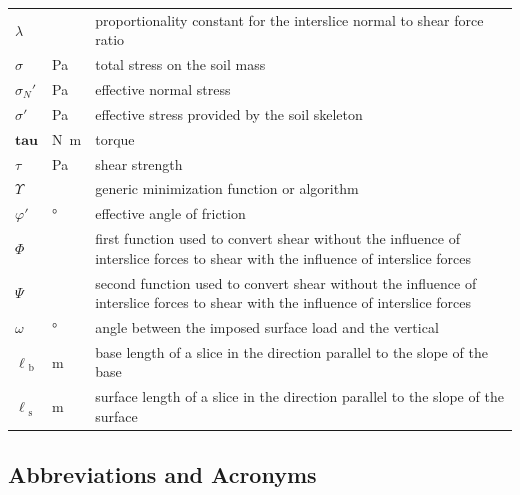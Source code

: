 \documentclass[12pt]{article}
\renewcommand{\arraystretch}{1}
\begin{document}
\begin{longtable*}{  l  l  p{8.5cm}  }
$\lambda{}$ & & proportionality constant for the interslice normal to shear 
force ratio
\\
$\sigma{}$ & \si{\pascal} & total stress on the soil mass
\\
$\sigma{}_N'$ & \si{\pascal} & effective normal stress
\\
$\sigma{}'$ & \si{\pascal} & effective stress provided by the soil skeleton
\\
$\textbf{tau{}}$ & \si{\newton\meter} & torque
\\
$\tau{}$ & \si{\pascal} & shear strength
\\
$\Upsilon{}$ & & generic minimization function or algorithm 
\\
$\varphi{}'$ & \si{\degree} & effective angle of friction
\\
$\Phi{}$ & & first function used to convert shear without the 
influence of interslice forces to shear with the influence of 
interslice forces
\\
$\Psi{}$ & & second function used to convert shear without the 
influence of interslice forces to shear with the influence of interslice 
forces
\\
$\omega{}$ & \si{\degree} & angle between the imposed surface load and the 
vertical
\\
${\ell{}_{\text{b}}}$ &  \si{\meter}& base length of a slice in the 
direction parallel to the slope of the base
\\
${\ell{}_{\text{s}}}$ &  \si{\meter}& surface length of a slice in the 
direction 
parallel to the slope of the surface \\

\hline
\end{longtable*}
\renewcommand{\arraystretch}{1}

\subsection{Abbreviations and Acronyms}
\end{document}
